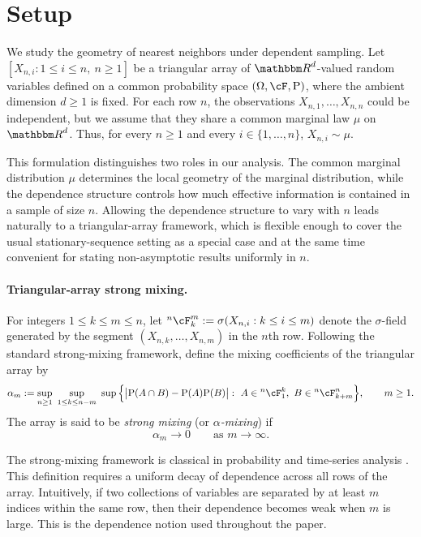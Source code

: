 \documentclass[12pt]{article}
\def\P{{\mathrm P}}
\def\R{{\mathbbm R}}
\theoremstyle{definition}
\begin{document}
\section{Setup}
\label{sec:setup}

We study the geometry of nearest neighbors under dependent sampling. Let $[X_{n,i}: 1 \le i \le n,\ n \ge 1]$ be a triangular array of $\R^d$-valued random variables defined on a common probability space $(\Omega,\cF,\P)$, where the ambient dimension $d \ge 1$ is fixed. For each row $n$, the observations $X_{n,1},\dots,X_{n,n}$ could be independent, but we assume that they share a common marginal law $\mu$ on $\R^d$. Thus, for every $n \ge 1$ and every $i \in \{1,\dots,n\}$, $X_{n,i} \sim \mu$.

This formulation distinguishes two roles in our analysis. The common marginal distribution $\mu$ determines the local geometry of the marginal distribution, while the dependence structure controls how much effective information is contained in a sample of size $n$. Allowing the dependence structure to vary with $n$ leads naturally to a triangular-array framework, which is flexible enough to cover the usual stationary-sequence setting as a special case and at the same time convenient for stating non-asymptotic results uniformly in $n$.

\paragraph*{Triangular-array strong mixing.} For integers $1 \le k \le m \le n$, let ${}^n\cF_k^m := \sigma(X_{n,i} : k \le i \le m)$ denote the $\sigma$-field generated by the segment $(X_{n,k},\dots,X_{n,m})$ in the $n$th row. Following the standard strong-mixing framework, define the mixing coefficients of the triangular array by
\[
\alpha_m
:=
\sup_{n \ge 1}\ \sup_{1 \le k \le n-m}\ 
\sup\Big\{
\big| \P(A \cap B) - \P(A)\P(B) \big|
:\ 
A \in {}^n\cF_1^k,\ 
B \in {}^n\cF_{k+m}^n
\Big\},
\qquad m \ge 1.
\]
The array is said to be \emph{strong mixing} (or \emph{$\alpha$-mixing}) if
\[
\alpha_m \to 0
\qquad\text{as } m \to \infty.
\]

The strong-mixing framework is classical in probability and time-series analysis \citep{bradley2005basic}. This definition requires a uniform decay of dependence across all rows of the array. Intuitively, if two collections of variables are separated by at least $m$ indices within the same row, then their dependence becomes weak when $m$ is large. This is the dependence notion used throughout the paper.
\end{document}
